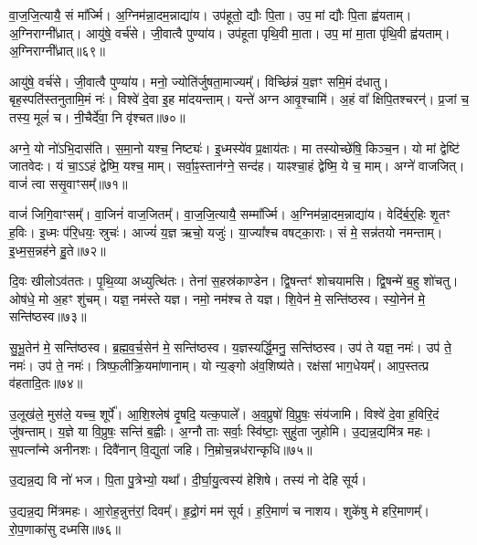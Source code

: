 वा॒ज॒जि॒त्यायै॒ सं मा᳚र्ज्मि।
अ॒ग्निम॑न्ना॒दम॒न्नाद्या॑य।
उप॑हूतो॒ द्यौः पि॒ता।
उप॒ मां द्यौः पि॒ता ह्व॑यताम्।
अ॒ग्निराग्नी᳚ध्रात्।
आयु॑षे॒ वर्च॑से।
जी॒वात्वै पुण्या॑य।
उप॑हूता पृथि॒वी मा॒ता।
उप॒ मां मा॒ता पृ॑थि॒वी ह्व॑यताम्।
अ॒ग्निराग्नी᳚ध्रात्॥६९॥\ip

आयु॑षे॒ वर्च॑से।
जी॒वात्वै पुण्या॑य।
मनो॒ ज्योति॑र्जुषता॒मा\-ज्यम्᳚।
विच्छि॑न्नं य॒ज्ञꣳ समि॒मं द॑धातु।
बृह॒स्पति॑स्तनुतामि॒मं नः॑।
विश्वे॑ दे॒वा इ॒ह मा॑दयन्ताम्।
यन्ते॑ अग्न आवृ॒श्चामि॑।
अ॒हं वा᳚ क्षिपि॒तश्चरन्॑।
प्र॒जां च॒ तस्य॒ मूलं॑ च।
नी॒चैर्दे॑वा॒ नि वृ॑श्चत॥७०॥\ip

अग्ने॒ यो नो॑\-ऽभि॒दास॑ति।
स॒मा॒नो यश्च॒ निष्ट्यः॑।
इ॒ध्मस्ये॑व प्र॒क्षाय॑तः।
मा तस्योच्छे॑षि॒ किञ्च॒न।
यो मां द्वेष्टि॑ जातवेदः।
यं चा॒ऽऽहं द्वेष्मि॒ यश्च॒ माम्।
सर्वा॒ꣴ॒स्तान॑ग्ने॒ सन्द॑ह।
याꣴश्चा॒हं द्वेष्मि॒ ये च॒ माम्।
अग्ने॑ वाजजित्।
वाजं॑ त्वा ससृ॒वाꣳसम्᳚॥७१॥\ip

वाजं॑ जिगि॒वाꣳसम्᳚।
वा॒जिनं॑ वाज॒जितम्᳚।
वा॒ज॒जि॒त्यायै॒ सम्मा᳚र्ज्मि।
अ॒ग्निम॑न्ना॒दम॒न्नाद्या॑य।
वेदि॑र्ब॒र्॒हिः शृ॒तꣳ ह॒विः।
इ॒ध्मः प॑रि॒धयः॒ स्रुचः॑।
आज्यं॑ य॒ज्ञ ऋचो॒ यजुः॑।
या॒ज्या᳚श्च वषट्का॒राः।
सं मे॒ सन्न॑तयो नमन्ताम्।
इ॒ध्म॒स॒न्नह॑ने हु॒ते॥७२॥\ip

दि॒वः खीलो\-ऽव॑ततः।
पृ॒थि॒व्या अध्युत्थि॑तः।
तेना॑ स॒हस्र॑काण्डेन।
द्वि॒षन्तꣳ॑ शोचयामसि।
द्वि॒षन्मे॑ ब॒हु शो॑चतु।
ओष॑धे॒ मो अ॒हꣳ शु॑चम्।
यज्ञ॒ नम॑स्ते यज्ञ।
नमो॒ नम॑श्च ते यज्ञ।
शि॒वेन॑ मे॒ सन्ति॑ष्ठस्व।
स्यो॒नेन॑ मे॒ सन्ति॑ष्ठस्व॥७३॥\ip

सु॒भू॒तेन॑ मे॒ सन्ति॑ष्ठस्व।
ब्र॒ह्म॒व॒र्च॒सेन॑ मे॒ सन्ति॑ष्ठस्व।
य॒ज्ञस्यर्द्धि॒मनु॒ सन्ति॑ष्ठस्व।
उप॑ ते यज्ञ॒ नमः॑।
उप॑ ते॒ नमः॑।
उप॑ ते॒ नमः॑।
त्रिष्फ॒लीक्रि॒यमा॑णानाम्।
यो न्य॒ङ्गो अ॑व॒शिष्य॑ते।
रक्ष॑सां भाग॒धेयम्᳚।
आप॒स्तत्प्र व॑हतादि॒तः॥७४॥\ip

उ॒लूख॑ले॒ मुस॑ले॒ यच्च॒ शूर्पे᳚।
आ॒शि॒श्लेष॑ दृ॒षदि॒ यत्क॒पाले᳚।
अ॒व॒प्रुषो॑ वि॒प्रुषः॒ संय॑जामि।
विश्वे॑ दे॒वा ह॒विरि॒दं जु॑षन्ताम्।
य॒ज्ञे या वि॒प्रुषः॒ सन्ति॑ ब॒ह्वीः।
अ॒ग्नौ ताः सर्वाः॒ स्वि॑ष्टाः॒ सुहु॑ता जुहोमि।
उ॒द्यन्न॒द्यमि॑त्र महः।
स॒पत्ना᳚न्मे अनीनशः।
दिवै॑नान् वि॒द्युता॑ जहि।
नि॒म्रोच॒न्नध॑रान्कृधि॥७५॥\ip

उ॒द्यन्न॒द्य वि नो॑ भज।
पि॒ता पु॒त्रेभ्यो॒ यथा᳚।
दी॒र्घा॒यु॒त्वस्य॑ हेशिषे।
तस्य॑ नो देहि सूर्य।


उ॒द्यन्न॒द्य मि॑त्रमहः।
आ॒रोह॒न्नुत्त॑रां॒ दिवम्᳚।
हृ॒द्रो॒गं मम॑ सूर्य।
ह॒रि॒माणं॑ च नाशय।
शुके॑षु मे हरि॒माणम्᳚।
रो॒प॒णाका॑सु दध्मसि॥७६॥\ip

